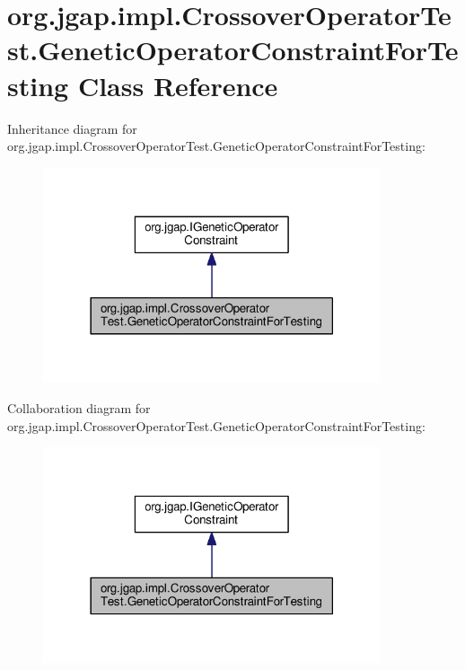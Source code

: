 \hypertarget{classorg_1_1jgap_1_1impl_1_1_crossover_operator_test_1_1_genetic_operator_constraint_for_testing}{\section{org.\-jgap.\-impl.\-Crossover\-Operator\-Test.\-Genetic\-Operator\-Constraint\-For\-Testing Class Reference}
\label{classorg_1_1jgap_1_1impl_1_1_crossover_operator_test_1_1_genetic_operator_constraint_for_testing}
}


Inheritance diagram for org.\-jgap.\-impl.\-Crossover\-Operator\-Test.\-Genetic\-Operator\-Constraint\-For\-Testing\-:
\nopagebreak
\begin{figure}[H]
\begin{center}
\leavevmode
\includegraphics[width=282pt]{classorg_1_1jgap_1_1impl_1_1_crossover_operator_test_1_1_genetic_operator_constraint_for_testing__inherit__graph}
\end{center}
\end{figure}


Collaboration diagram for org.\-jgap.\-impl.\-Crossover\-Operator\-Test.\-Genetic\-Operator\-Constraint\-For\-Testing\-:
\nopagebreak
\begin{figure}[H]
\begin{center}
\leavevmode
\includegraphics[width=282pt]{classorg_1_1jgap_1_1impl_1_1_crossover_operator_test_1_1_genetic_operator_constraint_for_testing__coll__graph}
\end{center}
\end{figure}
